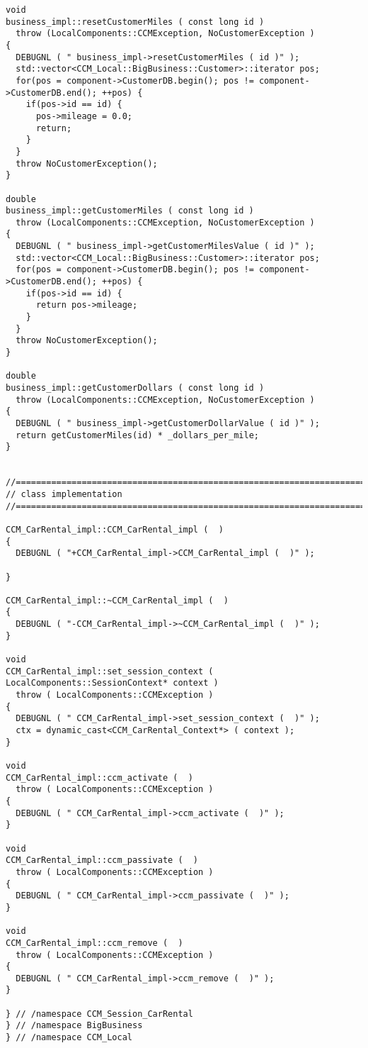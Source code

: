 \begin{scriptsize}
\begin{verbatim}
void
business_impl::resetCustomerMiles ( const long id )
  throw (LocalComponents::CCMException, NoCustomerException )
{
  DEBUGNL ( " business_impl->resetCustomerMiles ( id )" );
  std::vector<CCM_Local::BigBusiness::Customer>::iterator pos;
  for(pos = component->CustomerDB.begin(); pos != component->CustomerDB.end(); ++pos) {
    if(pos->id == id) {
      pos->mileage = 0.0;
      return;
    }
  }
  throw NoCustomerException(); 
}

double
business_impl::getCustomerMiles ( const long id )
  throw (LocalComponents::CCMException, NoCustomerException )
{
  DEBUGNL ( " business_impl->getCustomerMilesValue ( id )" );
  std::vector<CCM_Local::BigBusiness::Customer>::iterator pos;
  for(pos = component->CustomerDB.begin(); pos != component->CustomerDB.end(); ++pos) {
    if(pos->id == id) {
      return pos->mileage;
    }
  }
  throw NoCustomerException(); 
}

double
business_impl::getCustomerDollars ( const long id )
  throw (LocalComponents::CCMException, NoCustomerException )
{
  DEBUGNL ( " business_impl->getCustomerDollarValue ( id )" );
  return getCustomerMiles(id) * _dollars_per_mile;
}


//==============================================================================
// class implementation
//==============================================================================

CCM_CarRental_impl::CCM_CarRental_impl (  )
{
  DEBUGNL ( "+CCM_CarRental_impl->CCM_CarRental_impl (  )" );

}

CCM_CarRental_impl::~CCM_CarRental_impl (  )
{
  DEBUGNL ( "-CCM_CarRental_impl->~CCM_CarRental_impl (  )" );
}

void
CCM_CarRental_impl::set_session_context ( LocalComponents::SessionContext* context )
  throw ( LocalComponents::CCMException )
{
  DEBUGNL ( " CCM_CarRental_impl->set_session_context (  )" );
  ctx = dynamic_cast<CCM_CarRental_Context*> ( context );
}

void
CCM_CarRental_impl::ccm_activate (  )
  throw ( LocalComponents::CCMException )
{
  DEBUGNL ( " CCM_CarRental_impl->ccm_activate (  )" );
}

void
CCM_CarRental_impl::ccm_passivate (  )
  throw ( LocalComponents::CCMException )
{
  DEBUGNL ( " CCM_CarRental_impl->ccm_passivate (  )" );
}

void
CCM_CarRental_impl::ccm_remove (  )
  throw ( LocalComponents::CCMException )
{
  DEBUGNL ( " CCM_CarRental_impl->ccm_remove (  )" );
}

} // /namespace CCM_Session_CarRental
} // /namespace BigBusiness
} // /namespace CCM_Local
\end{verbatim}
\end{scriptsize}



